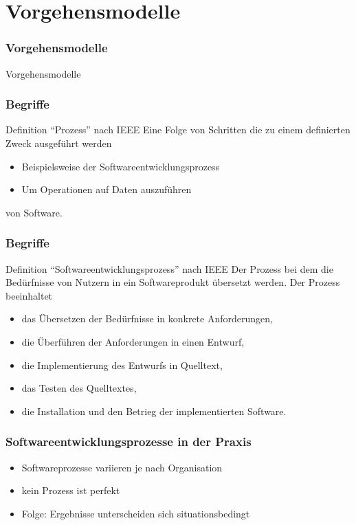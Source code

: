 \section{Vorgehensmodelle}
\begin{frame}[fragile]
\frametitle{Vorgehensmodelle}
\huge Vorgehensmodelle
\end{frame}

\begin{frame}
\frametitle{Begriffe}
	\begin{block}{Definition ``Prozess'' nach IEEE}
		Eine Folge von Schritten die zu einem definierten Zweck ausgeführt werden
		\begin{itemize}
			\item Beispielsweise der Softwareentwicklungsprozess
			\item Um Operationen auf Daten auszuführen
		\end{itemize}
		von Software.
	\end{block}	
\end{frame}

\begin{frame}
\frametitle{Begriffe}
	\begin{block}{Definition ``Softwareentwicklungsprozess'' nach IEEE}
		Der Prozess bei dem die Bedürfnisse von Nutzern in ein Softwareprodukt übersetzt werden.
		Der Prozess beeinhaltet
		\begin{itemize}
			\item das Übersetzen der Bedürfnisse in konkrete Anforderungen,
			\item die Überführen der Anforderungen in einen Entwurf,
			\item die Implementierung des Entwurfs in Quelltext,
			\item das Testen des Quelltextes,
			\item die Installation und den Betrieg der implementierten Software.
		\end{itemize}
	\end{block}	
\end{frame}

\begin{frame}
\frametitle{Softwareentwicklungsprozesse in der Praxis}
\begin{itemize}
	\item Softwareprozesse variieren je nach Organisation
	\item kein Prozess ist perfekt
	\item Folge: Ergebnisse unterscheiden sich situationsbedingt
\end{itemize}
\end{frame}

